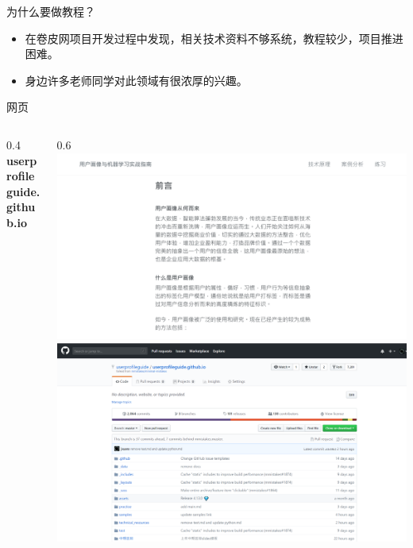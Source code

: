 \documentclass[10pt, aspectratio=32,handout]{beamer}
\begin{document}
\begin{frame}{为什么要做教程？}
  \begin{itemize}
    \item 在卷皮网项目开发过程中发现，相关技术资料不够系统，教程较少，项目推进困难。\newline
    \item 身边许多老师同学对此领域有很浓厚的兴趣。
  \end{itemize}
\end{frame}

\begin{frame}{网页}
\begin{columns}
  \begin{column}{0.4\paperheight}
    \textbf{userprofileguide.github.io}
  \end{column}
  \begin{column}{0.6\paperheight}
    \includegraphics[height=0.4\paperheight]{website1}
    \includegraphics[height=0.4\paperheight]{website2}
  \end{column}
  \end{columns}
\end{frame}
\end{document}
